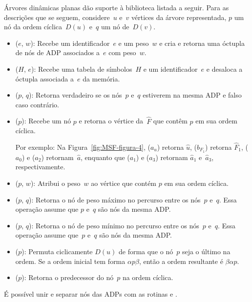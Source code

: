 Árvores dinâmicas planas dão suporte à biblioteca listada a seguir.
Para as descrições que se seguem, considere~$u$ e~$v$ vértices da árvore representada,
$p$ um nó da ordem cíclica~$D(u)$ e~$q$ um nó de~$D(v)$.

\begin{itemize}
\item \LCOMakeOcto($e$, $w$): Recebe um identificador~$e$ e um peso~$w$ e cria e retorna uma óctupla de nós de ADP associados a~$e$ com peso~$w$.
\item \LCODestroyOcto($H$, $e$): Recebe uma tabela de símbolos~$H$ e um identificador~$e$ e desaloca a óctupla associada a~$e$ da memória.

\item \LCOConnected($p$, $q$): Retorna verdadeiro se os nós~$p$ e~$q$ estiverem na mesma ADP e falso caso contrário.
\item \LCOFindNode($p$): Recebe um nó $p$ e retorna o vértice da~$\hat F$ que contêm $p$ em sua ordem cíclica.

Por exemplo: Na Figura~\ref{fig:MSF-figura-4}, \LCOFindNode($a_u$) retorna $\hat u$, \LCOFindNode($b_{F_1}$) retorna $\hat F_1$, \LCOFindNode($a_0$) e \LCOFindNode($a_2$) retornam~$\hat a$, enquanto que \LCOFindNode($a_1$) e \LCOFindNode($a_3$) retornam $\hat a_1$ e~$\hat a_3$, respectivamente.
\item \LCOAddCost($p$, $w$): Atribui o peso~$w$ ao vértice que contém $p$ em sua ordem cíclica.
\item \LCOMax($p$, $q$): Retorna o nó de peso máximo no percurso entre os nós~$p$ e~$q$.
Essa operação assume que $p$ e~$q$ são nós da mesma ADP.
\item \LCOMin($p$, $q$): Retorna o nó de peso mínimo no percurso entre os nós~$p$ e~$q$.
Essa operação assume que~$p$ e~$q$ são nós da mesma ADP.
\item \LCOCycle($p$): Permuta ciclicamente $D(u)$ de forma que o nó~$p$ seja o último na ordem.
Se a ordem inicial tem forma $\alpha p \beta$, então a ordem resultante é $\beta\alpha p$.
\item \treapPredecessor($p$): Retorna o predecessor do nó~$p$ na ordem cíclica.
\end{itemize}

É possível unir e separar nós das ADPs com as rotinas \LCOMerge{} e \LCOSplit{}.

